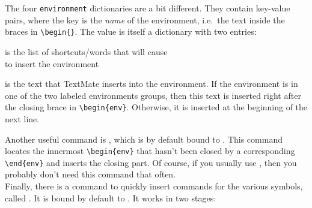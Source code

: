 \documentclass[11pt, x11names]{article}
\begin{document}
The four \texttt{environment} dictionaries are a bit different. They contain key-value pairs, where the key is the \emph{name} of the environment, i.e.~the text inside the braces in \texttt{\textbackslash{}begin\{\}}. The value is itself a dictionary with two entries:

\begin{description}[style=multiline, leftmargin=1.8cm]

  \item[\texttt{triggers}] is the list of shortcuts/words that will cause\\  to insert the environment

  \item[\texttt{content}] is the text that TextMate inserts into the environment. If the environment is in one of the two labeled environments groups, then this text is inserted right after the closing brace in \texttt{\textbackslash{}begin\{env\}}. Otherwise, it is inserted at the beginning of the next line.

\end{description}

Another useful command is , which is by default bound to . This command locates the innermost \texttt{\textbackslash{}begin\{env\}} that hasn't been closed by a corresponding \texttt{\textbackslash{}end\{env\}} and inserts the closing part. Of course, if you usually use , then you probably don't need this command that often.\\

Finally, there is a command to quickly insert commands for the various symbols, called . It is bound by default to \keys{\cmd + \textbackslash{}}. It works in two stages:
\end{document}
